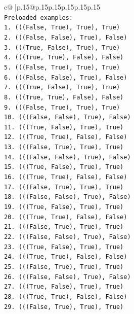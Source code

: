 \documentclass{article}
\begin{document}
{\begin{supertabular}{c@{$\;$}|p{.15\linewidth}@{}p{.15\linewidth}p{.15\linewidth}p{.15\linewidth}p{.15\linewidth}p{.15\linewidth}}
{{{\\ 
\texttt{Preloaded examples:} \\
\texttt{1. (((False, True), True), True)} \\
\texttt{2. (((False, False), True), False)} \\
\texttt{3. (((True, False), True), True)} \\
\texttt{4. (((True, True), False), False)} \\
\texttt{5. (((False, True), True), True)} \\
\texttt{6. (((False, False), True), False)} \\
\texttt{7. (((True, False), True), True)} \\
\texttt{8. (((True, True), False), False)} \\
\texttt{9. (((False, True), True), True)} \\
\texttt{10. (((False, False), True), False)} \\
\texttt{11. (((True, False), True), True)} \\
\texttt{12. (((True, True), False), False)} \\
\texttt{13. (((False, True), True), True)} \\
\texttt{14. (((False, False), True), False)} \\
\texttt{15. (((True, False), True), True)} \\
\texttt{16. (((True, True), False), False)} \\
\texttt{17. (((False, True), True), True)} \\
\texttt{18. (((False, False), True), False)} \\
\texttt{19. (((True, False), True), True)} \\
\texttt{20. (((True, True), False), False)} \\
\texttt{21. (((False, True), True), True)} \\
\texttt{22. (((False, False), True), False)} \\
\texttt{23. (((True, False), True), True)} \\
\texttt{24. (((True, True), False), False)} \\
\texttt{25. (((False, True), True), True)} \\
\texttt{26. (((False, False), True), False)} \\
\texttt{27. (((True, False), True), True)} \\
\texttt{28. (((True, True), False), False)} \\
\texttt{29. (((False, True), True), True)} \\
}}}
\end{supertabular}}
\end{document}

